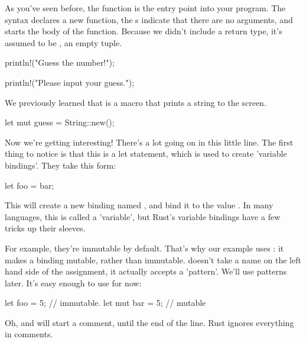 \begin{rustc}
fn main() {
\end{rustc}

As you've seen before, the  function is the entry point into your program. The  syntax declares a new 
function, the \code{()}s indicate that there are no arguments, and \code{\{} starts the body of the function. Because we 
didn't include a return type, it's assumed to be \code{()}, an empty tuple.

\begin{rustc}
    println!("Guess the number!");

    println!("Please input your guess.");
\end{rustc}

We previously learned that  is a macro that prints a string to the screen.

\begin{rustc}
    let mut guess = String::new();
\end{rustc}

Now we're getting interesting! There's a lot going on in this little line. The first thing to notice is that this is a 
let statement, which is used to create 'variable bindings'. They take this form:

\begin{rustc}
let foo = bar;
\end{rustc}

This will create a new binding named , and bind it to the value . In many languages, this is called a 
'variable', but Rust's variable bindings have a few tricks up their sleeves.

\blank

For example, they're immutable by default. That's why our example uses : it makes a binding mutable, rather than 
immutable.  doesn't take a name on the left hand side of the assignment, it actually accepts a 'pattern'. We'll 
use patterns later. It's easy enough to use for now:

\begin{rustc}
let foo = 5; // immutable.
let mut bar = 5; // mutable
\end{rustc}

Oh, and \code{//} will start a comment, until the end of the line. Rust ignores everything in comments.

